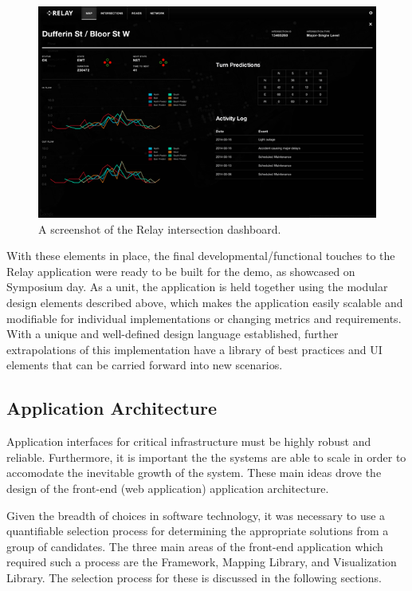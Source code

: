 \documentclass{report}
\begin{document}
\begin{figure}[htbp!]
  \begin{centering}
    \includegraphics[scale=0.73]{figures/dashboard.png}
    \caption{A screenshot of the Relay intersection dashboard.}
    \label{fig:dashboardt}
  \end{centering}
\end{figure}

With these elements in place, the final developmental/functional touches to the Relay application were ready to be built for the demo, as showcased on Symposium day.
As a unit, the application is held together using the modular design elements described above, which makes the application easily scalable and modifiable for individual implementations or changing metrics and requirements.
With a unique and well-defined design language established, further extrapolations of this implementation have a library of best practices and UI elements that can be carried forward into new scenarios.

\subsection{Application Architecture}

Application interfaces for critical infrastructure must be highly robust and reliable. Furthermore, it is important the the systems are able to scale in order to accomodate the inevitable growth of the system. These main ideas drove the design of the front-end (web application) application architecture. 

Given the breadth of choices in software technology, it was necessary to use a quantifiable selection process for determining the appropriate solutions from a group of candidates. The three main areas of the front-end application which required such a process are the Framework, Mapping Library, and Visualization Library. The selection process for these is discussed in the following sections.
\end{document}
